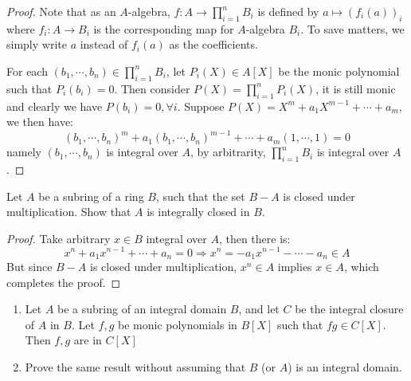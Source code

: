 \documentclass{solution}
\begin{document}
\begin{proof}
    Note that as an $A$-algebra, $f: A \rightarrow \prod\limits_{i = 1}^{n} B_i$ is defined by $a \mapsto (f_i(a))_i$ where $f_i: A \rightarrow B_i$ is the corresponding map for $A$-algebra $B_i$. To save matters, we simply write $a$ instead of $f_i(a)$ as the coefficients.

    For each $(b_1, \cdots, b_n) \in \prod\limits_{i = 1}^{n} B_i$, let $P_i(X) \in A[X]$ be the monic polynomial such that $P_i(b_i) = 0$. Then consider $P(X) = \prod\limits_{i = 1}^{n} P_i(X)$, it is still monic and clearly we have $P(b_i) = 0, \forall i$. Suppose $P(X) = X^m + a_1X^{m - 1} + \cdots + a_m$, we then have:
    $$(b_1, \cdots, b_n)^m + a_1 (b_1, \cdots, b_n)^{m - 1} + \cdots + a_m(1, \cdots, 1) = 0$$
    namely $(b_1, \cdots, b_n)$ is integral over $A$, by arbitrarity, $\prod\limits_{i = 1}^{n} B_i$ is integral over $A$.
\end{proof}

\begin{problem}
    Let $A$ be a subring of a ring $B$, such that the set $B - A$ is closed under multiplication. Show that $A$ is integrally closed in $B$.
\end{problem}

\begin{proof}
    Take arbitrary $x \in B$ integral over $A$, then there is:
    $$x^n + a_1x^{n - 1} + \cdots + a_n = 0 \Rightarrow x^n = -a_1x^{n - 1} - \cdots - a_n \in A$$
    But since $B - A$ is closed under multiplication, $x^n \in A$ implies $x \in A$, which completes the proof.
\end{proof}

\begin{problem}
    \begin{enumerate}
        \item Let $A$ be a subring of an integral domain $B$, and let $C$ be the integral closure of $A$ in $B$. Let $f, g$ be monic polynomials in $B[X]$ such that $fg \in C[X]$. Then $f, g$ are in $C[X]$
        \item Prove the same result without assuming that $B$ (or $A$) is an integral domain.
    \end{enumerate}
\end{problem}
\end{document}

